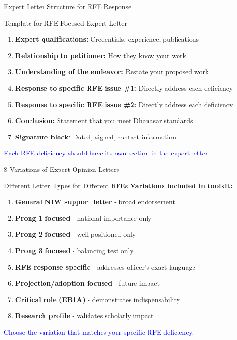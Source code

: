\documentclass[11pt]{beamer}
\begin{document}
	\begin{frame}{Expert Letter Structure for RFE Response}
		\scriptsize
		\begin{block}{Template for RFE-Focused Expert Letter}
			\begin{enumerate}
				\item \textbf{Expert qualifications:} Credentials, experience, publications
				\item \textbf{Relationship to petitioner:} How they know your work
				\item \textbf{Understanding of the endeavor:} Restate your proposed work
				\item \textbf{Response to specific RFE issue \#1:} Directly address each deficiency
				\item \textbf{Response to specific RFE issue \#2:} Directly address each deficiency
				\item \textbf{Conclusion:} Statement that you meet Dhanasar standards
				\item \textbf{Signature block:} Dated, signed, contact information
			\end{enumerate}
			\textcolor{blue}{Each RFE deficiency should have its own section in the expert letter.}
		\end{block}
	\end{frame}
	
	\begin{frame}{8 Variations of Expert Opinion Letters}
		\scriptsize
		\begin{block}{Different Letter Types for Different RFEs}
			\textbf{Variations included in toolkit:}
			\begin{enumerate}
				\item \textbf{General NIW support letter} - broad endorsement
				\item \textbf{Prong 1 focused} - national importance only
				\item \textbf{Prong 2 focused} - well-positioned only
				\item \textbf{Prong 3 focused} - balancing test only
				\item \textbf{RFE response specific} - addresses officer's exact language
				\item \textbf{Projection/adoption focused} - future impact
				\item \textbf{Critical role (EB1A)} - demonstrates indispensability
				\item \textbf{Research profile} - validates scholarly impact
			\end{enumerate}
			\textcolor{blue}{Choose the variation that matches your specific RFE deficiency.}
		\end{block}
	\end{frame}
	
\end{document}

